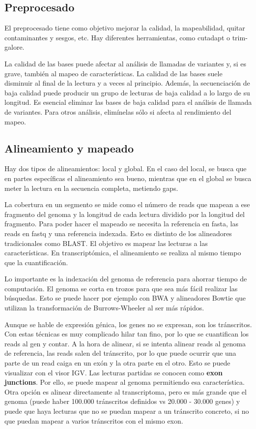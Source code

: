 \subsection{Preprocesado}
El preprocesado tiene como objetivo mejorar la calidad, la mapeabilidad, quitar contaminantes y sesgos, etc. Hay diferentes herramientas, como cutadapt o trim-galore. 

La calidad de las bases puede afectar al análisis de llamadas de variantes y, si es grave, también al mapeo de características. La calidad de las bases suele disminuir al final de la lectura y a veces al principio. Además, la secuenciación de baja calidad puede producir un grupo de lecturas de baja calidad a lo largo de su longitud. Es esencial eliminar las bases de baja calidad para el análisis de llamada de variantes. Para otros análisis, elimínelas sólo si afecta al rendimiento del mapeo.

\subsection{Alineamiento y mapeado}
Hay dos tipos de alineamientos: local y global. En el caso del local, se busca que en partes específicas el alineamiento sea bueno, mientras que en el global se busca meter la lectura en la secuencia completa, metiendo gaps. 

La cobertura en un segmento se mide como el número de reads que mapean a ese fragmento del genoma y la longitud de cada lectura dividido por la longitud del fragmento. Para poder hacer el mapeado se necesita la referencia en fasta, las reads en fastq y una referencia indexada. Esto es distinto de los alineadores tradicionales como BLAST. El objetivo es mapear las lecturas a las características. En transcriptómica, el alineamiento se realiza al mismo tiempo que la cuantificación. 

Lo importante es la indexación del genoma de referencia para ahorrar tiempo de computación. El genoma se corta en trozos para que sea más fácil realizar las búsquedas. Esto se puede hacer por ejemplo con BWA y alineadores Bowtie que utilizan la transformación de Burrows-Wheeler al ser más rápidos.

Aunque se hable de expresión génica, los genes no se expresan, son los tránscritos. Con estas técnicas es muy complicado hilar tan fino, por lo que se cuantifican los reads al gen y contar. A la hora de alinear, si se intenta alinear reads al genoma de referencia, las reads salen del tránscrito, por lo que puede ocurrir que una parte de un read caiga en un exón y la otra parte en el otro. Esto se puede visualizar con el visor IGV. Las lecturas partidas se conocen como \textbf{exon junctions}. Por ello, se puede mapear al genoma permitiendo esa característica. Otra opción es alinear directamente al transcriptoma, pero es más grande que el genoma (puede haber 100.000 tránscritos definidos vs 20.000 - 30.000 genes) y puede que haya lecturas que no se puedan mapear a un tránscrito concreto, si no que puedan mapear a varios tránscritos con el mismo exon.

